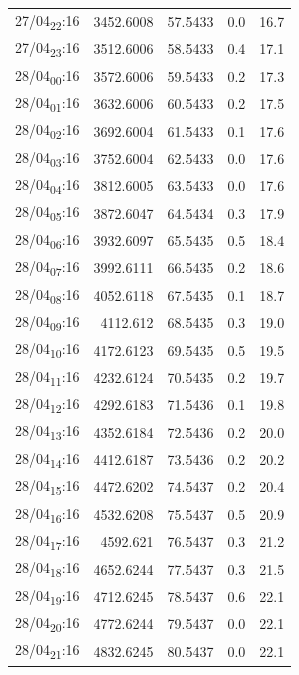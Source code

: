 \documentclass[11pt]{article}
\begin{document}
\begin{table}[htbp]
\begin{tabular}{lrrrr}
27/04\textsubscript{22}:16 & 3452.6008 & 57.5433 & 0.0 & 16.7\\[0pt]
27/04\textsubscript{23}:16 & 3512.6006 & 58.5433 & 0.4 & 17.1\\[0pt]
28/04\textsubscript{00}:16 & 3572.6006 & 59.5433 & 0.2 & 17.3\\[0pt]
28/04\textsubscript{01}:16 & 3632.6006 & 60.5433 & 0.2 & 17.5\\[0pt]
28/04\textsubscript{02}:16 & 3692.6004 & 61.5433 & 0.1 & 17.6\\[0pt]
28/04\textsubscript{03}:16 & 3752.6004 & 62.5433 & 0.0 & 17.6\\[0pt]
28/04\textsubscript{04}:16 & 3812.6005 & 63.5433 & 0.0 & 17.6\\[0pt]
28/04\textsubscript{05}:16 & 3872.6047 & 64.5434 & 0.3 & 17.9\\[0pt]
28/04\textsubscript{06}:16 & 3932.6097 & 65.5435 & 0.5 & 18.4\\[0pt]
28/04\textsubscript{07}:16 & 3992.6111 & 66.5435 & 0.2 & 18.6\\[0pt]
28/04\textsubscript{08}:16 & 4052.6118 & 67.5435 & 0.1 & 18.7\\[0pt]
28/04\textsubscript{09}:16 & 4112.612 & 68.5435 & 0.3 & 19.0\\[0pt]
28/04\textsubscript{10}:16 & 4172.6123 & 69.5435 & 0.5 & 19.5\\[0pt]
28/04\textsubscript{11}:16 & 4232.6124 & 70.5435 & 0.2 & 19.7\\[0pt]
28/04\textsubscript{12}:16 & 4292.6183 & 71.5436 & 0.1 & 19.8\\[0pt]
28/04\textsubscript{13}:16 & 4352.6184 & 72.5436 & 0.2 & 20.0\\[0pt]
28/04\textsubscript{14}:16 & 4412.6187 & 73.5436 & 0.2 & 20.2\\[0pt]
28/04\textsubscript{15}:16 & 4472.6202 & 74.5437 & 0.2 & 20.4\\[0pt]
28/04\textsubscript{16}:16 & 4532.6208 & 75.5437 & 0.5 & 20.9\\[0pt]
28/04\textsubscript{17}:16 & 4592.621 & 76.5437 & 0.3 & 21.2\\[0pt]
28/04\textsubscript{18}:16 & 4652.6244 & 77.5437 & 0.3 & 21.5\\[0pt]
28/04\textsubscript{19}:16 & 4712.6245 & 78.5437 & 0.6 & 22.1\\[0pt]
28/04\textsubscript{20}:16 & 4772.6244 & 79.5437 & 0.0 & 22.1\\[0pt]
28/04\textsubscript{21}:16 & 4832.6245 & 80.5437 & 0.0 & 22.1\\[0pt]

\end{tabular}
\end{table}
\end{document}
